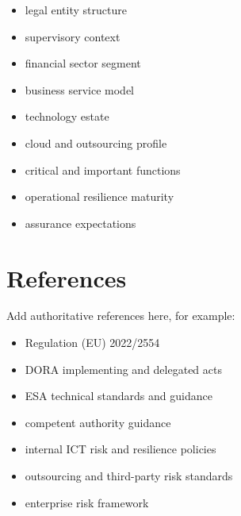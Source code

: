 \documentclass[
  letterpaper,
  DIV=11,
  numbers=noendperiod]{scrartcl}
\providecommand{\tightlist}{%
  \setlength{\itemsep}{0pt}\setlength{\parskip}{0pt}}
\begin{document}
\begin{itemize}
\tightlist
\item
  legal entity structure
\item
  supervisory context
\item
  financial sector segment
\item
  business service model
\item
  technology estate
\item
  cloud and outsourcing profile
\item
  critical and important functions
\item
  operational resilience maturity
\item
  assurance expectations
\end{itemize}

\section{References}\label{references}

Add authoritative references here, for example:

\begin{itemize}
\tightlist
\item
  Regulation (EU) 2022/2554
\item
  DORA implementing and delegated acts
\item
  ESA technical standards and guidance
\item
  competent authority guidance
\item
  internal ICT risk and resilience policies
\item
  outsourcing and third-party risk standards
\item
  enterprise risk framework
\end{itemize}
\end{document}

